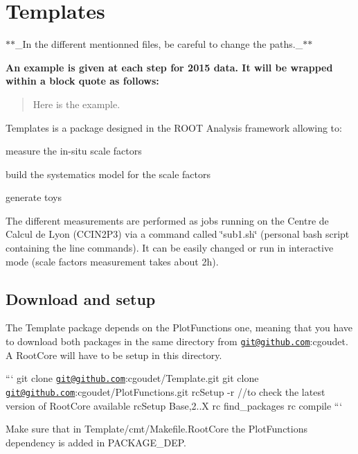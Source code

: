 \section*{Templates}

$\ast$$\ast$\+\_\+\+In the different mentionned files, be careful to change the paths.\+\_\+$\ast$$\ast$

{\bfseries An example is given at each step for 2015 data. It will be wrapped within a block quote as follows\+:}

\begin{quote}
Here is the example. \end{quote}






Templates is a package designed in the R\+O\+O\+T Analysis framework allowing to\+:
\begin{DoxyItemize}
\item measure the in-\/situ scale factors
\item build the systematics model for the scale factors
\item generate toys
\end{DoxyItemize}

The different measurements are performed as jobs running on the Centre de Calcul de Lyon (C\+C\+I\+N2\+P3) via a command called \char`\"{}sub1.\+sh\char`\"{} (personal bash script containing the line commands). It can be easily changed or run in interactive mode (scale factors measurement takes about 2h).

\subsection*{Download and setup }

The Template package depends on the Plot\+Functions one, meaning that you have to download both packages in the same directory from \href{mailto:git@github.com}{\tt git@github.\+com}\+:cgoudet. A Root\+Core will have to be setup in this directory.

``` git clone \href{mailto:git@github.com}{\tt git@github.\+com}\+:cgoudet/\+Template.\+git git clone \href{mailto:git@github.com}{\tt git@github.\+com}\+:cgoudet/\+Plot\+Functions.\+git rc\+Setup -\/r //to check the latest version of Root\+Core available rc\+Setup Base,2..\+X rc find\+\_\+packages rc compile ```

Make sure that in Template/cmt/\+Makefile.\+Root\+Core the Plot\+Functions dependency is added in P\+A\+C\+K\+A\+G\+E\+\_\+\+D\+E\+P.

